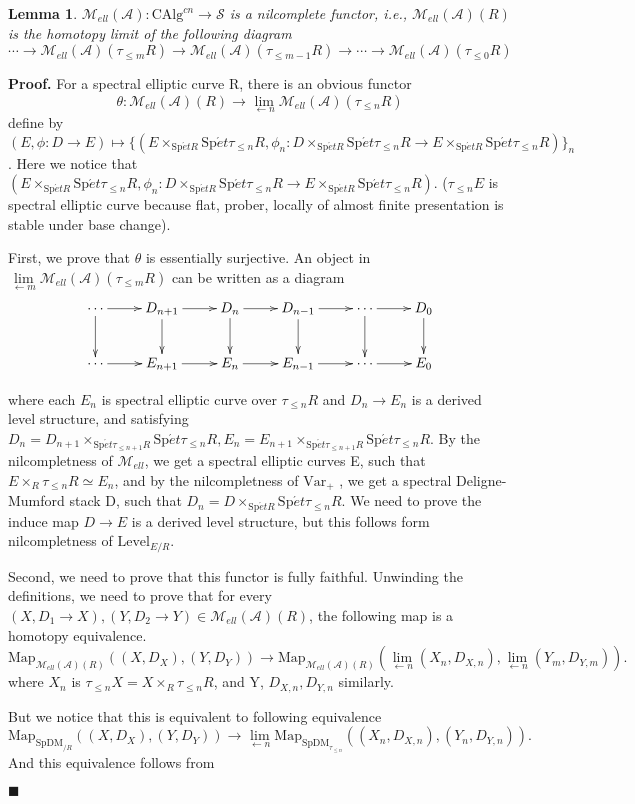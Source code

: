 \documentclass[12pt]{article}
\newtheorem{lemma}[theorem]{Lemma}
\theoremstyle{thry}
\renewenvironment{proof}
{\par \noindent \textbf{Proof.}}
{ \par \hfill $\blacksquare$ \quad \par }
\def  \CAlg     {\mathrm{CAlg}}
\def  \Level    {\mathrm{Level}}
\def  \Map      {\mathrm{Map}}
\def  \Spet     {\mathrm{Sp}\acute{e}t}
\def  \SpDM     {\mathrm{SpDM}}
\def  \ca       {\mathcal{A}}
\def  \cm       {\mathcal{M}}
\def  \cs       {\mathcal{S}}
\begin{document}
\begin{lemma}
	$\cm_{ell}(\ca): \CAlg^{cn} \to  \cs$  is a nilcomplete functor, i.e., $\cm_{ell}(\ca) (R)$ is the homotopy limit of the following diagram
	$$
	\cdots \to  \cm_{ell}(\ca)( \tau_{\leq m}R) \to \cm_{ell}(\ca)(\tau_{\leq m-1} R) \to \cdots \to  \cm_{ell}(\ca)(\tau_{\leq 0}R)
	$$
\end{lemma}
\begin{proof}
	For a  spectral elliptic curve R,  there is an obvious functor
	$$
	\theta: \cm_{ell}(\ca)(R) \to  \underset{\leftarrow n}{\lim}\cm_{ell}(\ca)(\tau_{\leq n}R)
	$$
	define by $(E, \phi: D\to E ) \mapsto \{(E \times_{\Spet R}  \Spet \tau_{\leq n}R, \phi_n:  D \times_{\Spet R}  \Spet \tau_{\leq n}R \to E \times_{\Spet R}  \Spet \tau_{\leq n}R) \}_n$. Here we notice that $(E \times_{\Spet R}  \Spet \tau_{\leq n}R, \phi_n:  D \times_{\Spet R}  \Spet \tau_{\leq n}R \to E \times_{\Spet R}  \Spet \tau_{\leq n}R)$. ($\tau_{\leq n }E$ is spectral elliptic curve because flat,  prober, locally of almost finite presentation is stable under base change).
	
	
	First, we prove that $\theta$ is essentially surjective. An object in  $\underset{\leftarrow m}{\lim } \cm_{ell}(\ca)(\tau_{\leq m}R)$  can be written as a diagram 
	$$
	\xymatrix{
		\cdots  \ar[r]  \ar[d]&  D_{n+1} \ar[r] \ar[d]  & D_{n} \ar[r] \ar[d]& D_{ n-1} \ar[r] \ar[d]   & \cdots \ar[r] \ar[d]&   D_0 \ar[d] \\
		\cdots   \ar[r] &  E_{n+1} \ar[r]    & E_{n}  \ar[r]& E_{ n-1} \ar[r]   & \cdots   \ar[r] &   E_0   \\  
	}
	$$
	
	where  each $E_n$ is spectral elliptic curve over $\tau_{\leq n}R$ and  $D_n \to  E_n $ is a derived  level structure, and satisfying $D_n = D_{n+1} \times_{\Spet \tau_{\leq n+1}R}  \Spet \tau_{\leq n}R,  E_n = E_{n+1} \times_{\Spet \tau_{\leq n+1}R}  \Spet \tau_{\leq n}R$.  By the  nilcompletness of  $\cm_{ell}$, we get a spectral elliptic curves E, such that  $E \times_R \tau_{\leq n}R \simeq E_n$, and by the nilcompletness of $\mathrm{Var}_{+}$ \cite[Proposition 19.4.2.1]{lu-SAG}, we get a spectral Deligne-Mumford stack D, such that $D_n=D \times_{\Spet R }\Spet \tau_{\leq n}R$. We need to prove the induce map $D \to E$ is a derived level structure, but this follows form nilcompletness of $\Level_{E/R}$.
	
	Second, we need to prove that this functor is  fully faithful. Unwinding the definitions, we need to prove that  for every $(X, D_1 \to X), (Y, D_2 \to Y)  \in  \cm_{ell}(\ca)(R)$, the following map is a homotopy equivalence.
	$$
	\Map_{\cm_{ell}(\ca)(R)}((X, D_X),(Y, D_Y)) \to  \Map_{\cm_{ell}(\ca)(R)}( \underset{\leftarrow n}{\lim} (X_n, D_{X,n} ),  \underset{\leftarrow n}{\lim}(Y_m, D_{Y,m})).   
	$$
	where $X_n $ is $ \tau_{\leq n}X  = X \times_R \tau_{\leq n}R$, and Y, $D_{X,n},D_{Y,n}$ similarly.
	
	But we notice that  this  is equivalent to following equivalence
	$$
	\Map_{\SpDM_{/R}}((X, D_X),(Y, D_Y)) \to  \underset{\leftarrow n}{\lim}\Map_{\SpDM_{\tau_{\leq n}}}(  (X_n, D_{X,n} ), (Y_n, D_{Y,n})).   
	$$
	And this equivalence follows from \cite[Proposition 19.4.1.2]{lu-SAG}
\end{proof}
\end{document}
